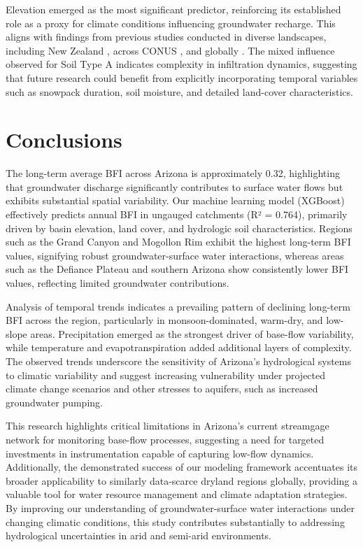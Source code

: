 \documentclass[
  authoryear,
  preprint,
  1p,
  onecolumn]{elsarticle}
\begin{document}
Elevation emerged as the most significant predictor, reinforcing its
established role as a proxy for climate conditions influencing
groundwater recharge. This aligns with findings from previous studies
conducted in diverse landscapes, including New Zealand
\citep{singh2018}, across CONUS \citep{santhi2008}, and globally
\citep{beck2013}. The mixed influence observed for Soil Type A indicates
complexity in infiltration dynamics, suggesting that future research
could benefit from explicitly incorporating temporal variables such as
snowpack duration, soil moisture, and detailed land-cover
characteristics.

\section{Conclusions}\label{conclusions}

The long-term average BFI across Arizona is approximately 0.32,
highlighting that groundwater discharge significantly contributes to
surface water flows but exhibits substantial spatial variability. Our
machine learning model (XGBoost) effectively predicts annual BFI in
ungauged catchments (R² = 0.764), primarily driven by basin elevation,
land cover, and hydrologic soil characteristics. Regions such as the
Grand Canyon and Mogollon Rim exhibit the highest long-term BFI values,
signifying robust groundwater-surface water interactions, whereas areas
such as the Defiance Plateau and southern Arizona show consistently
lower BFI values, reflecting limited groundwater contributions.

Analysis of temporal trends indicates a prevailing pattern of declining
long-term BFI across the region, particularly in monsoon-dominated,
warm-dry, and low-slope areas. Precipitation emerged as the strongest
driver of base-flow variability, while temperature and
evapotranspiration added additional layers of complexity. The observed
trends underscore the sensitivity of Arizona's hydrological systems to
climatic variability and suggest increasing vulnerability under
projected climate change scenarios and other stresses to aquifers, such
as increased groundwater pumping.

This research highlights critical limitations in Arizona's current
streamgage network for monitoring base-flow processes, suggesting a need
for targeted investments in instrumentation capable of capturing
low-flow dynamics. Additionally, the demonstrated success of our
modeling framework accentuates its broader applicability to similarly
data-scarce dryland regions globally, providing a valuable tool for
water resource management and climate adaptation strategies. By
improving our understanding of groundwater-surface water interactions
under changing climatic conditions, this study contributes substantially
to addressing hydrological uncertainties in arid and semi-arid
environments.


\renewcommand\refname{References}
  
\end{document}
